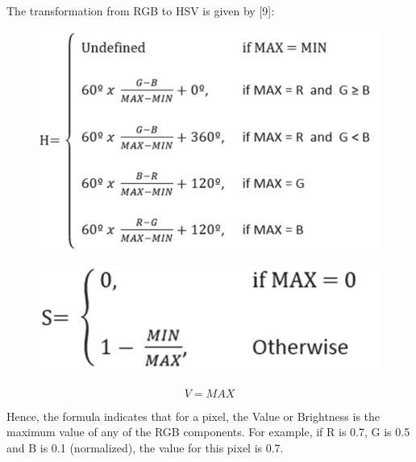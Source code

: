 The transformation from RGB to HSV is given by [9]:

\begin{figure}
  	\includegraphics[scale=0.4]{images/ch2/H.jpg}
  	\label{fig:H}
\end{figure}

\begin{figure}
  	\includegraphics[scale=0.4]{images/ch2/S.jpg}
  	\label{fig:S}
\end{figure}

\begin{equation}
	V=MAX
\end{equation}

Hence, the formula indicates that for a pixel, the Value or Brightness is the maximum value of any of the RGB components. For example, if R is 0.7, G is 0.5 and B is 0.1 (normalized), the value for this pixel is 0.7.

